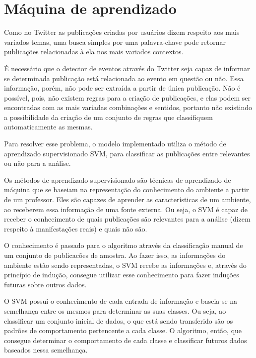 \chapter{Máquina de aprendizado}

Como no Twitter as publicações criadas por usuários dizem respeito aos mais variados temas, uma busca simples por uma palavra-chave pode retornar publicações relacionadas à ela nos mais variados contextos.

É necessário que o detector de eventos através do Twitter seja capaz de informar se determinada publicação está relacionada ao evento em questão ou não. Essa informação, porém, não pode ser extraída a partir de única publicação. Não é possível, pois, não existem regras para a criação de publicações, e elas podem ser encontradas com as mais variadas combinações e sentidos, portanto não existindo a possibilidade da criação de um conjunto de regras que classifiquem automaticamente as mesmas.

Para resolver esse problema, o modelo implementado utiliza o método de aprendizado supervisionado SVM, para classificar as publicações entre relevantes ou não para a análise.

Os métodos de aprendizado supervisionado são técnicas de aprendizado de máquina que se baseiam na representação do conhecimento do ambiente a partir de um professor. Eles são capazes de aprender as características de um ambiente, ao receberem essa informação de uma fonte externa. Ou seja, o SVM é capaz de receber o conhecimento de quais publicações são relevantes para a análise (dizem respeito à manifestações reais) e quais não são. 

O conhecimento é passado para o algoritmo através da classificação manual de um conjunto de publicacões de amostra. Ao fazer isso, as informações do ambiente estão sendo representadas, o SVM recebe as informações e, através do princípio de indução, consegue utilizar esse conhecimento para fazer induções futuras sobre outros dados.

O SVM possui o conhecimento de cada entrada de informação e baseia-se na semelhança entre os mesmos para determinar as suas classes. Ou seja, ao classificar um conjunto inicial de dados, o que está sendo transferido são os padrões de comportamento pertencente a cada classe. O algoritmo, então, que consegue determinar o comportamento de cada classe e classificar futuros dados baseados nessa semelhança.

